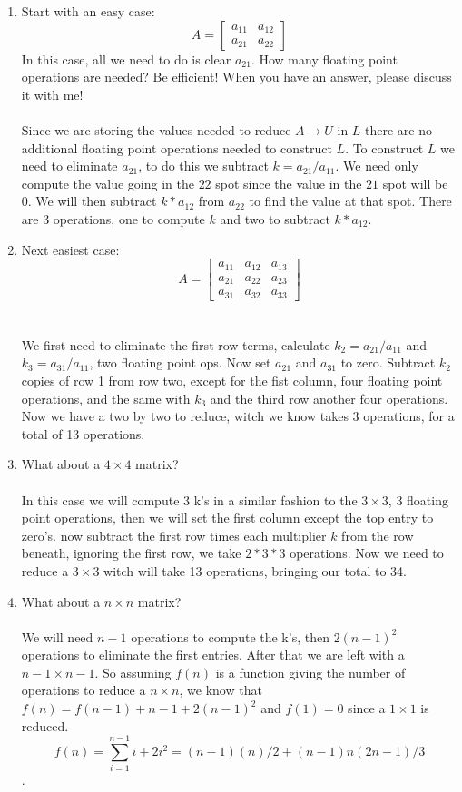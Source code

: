 \documentclass[12pt]{article}
\theoremstyle{homework}
\begin{document}
\begin{enumerate}[(1)]
\item
Start with an easy case:
$$A =
\begin{bmatrix}
a_{11} & a_{12}\\
a_{21} & a_{22}
\end{bmatrix}
$$
In this case, all we need to do is clear $a_{21}$. How many floating point operations are needed?  Be efficient! When you have an answer, please discuss it with me!\\\\
Since we are storing the values needed to reduce $A\rightarrow U$ in $L$ there are no additional floating point operations needed to construct $L$.  To construct $L$ we need to eliminate $a_{21}$, to do this we subtract $k=a_{21}/a_{11}$.  We need only compute the value going in the $22$ spot since the value in the $21$ spot will be 0.  We will then subtract $k*a_{12}$ from $a_{22}$ to find the value at that spot.  There are 3 operations, one to compute $k$ and two to subtract $k*a_{12}$.
\item
Next easiest case:
$$A =\begin{bmatrix}
a_{11}& a_{12}& a_{13}\\
a_{21}& a_{22}& a_{23}\\
a_{31}& a_{32}& a_{33}
\end{bmatrix}$$\\\\
We first need to eliminate the first row terms, calculate $k_2=a_{21}/a_{11}$ and $k_3=a_{31}/a_{11}$, two floating point ops.  Now set $a_{21}$ and $a_{31}$ to zero.  Subtract $k_2$ copies of row 1 from row two, except for the fist column, four floating point operations, and the same with $k_3$ and the third row another four operations.  Now we have a two by two to reduce, witch we know takes 3 operations, for a total of 13 operations.
\item
What about a $4\times 4$ matrix?\\\\
In this case we will compute 3 k's in a similar fashion to the $3\times 3$, 3 floating point operations, then we will set the first column except the top entry to zero's.  now subtract the first row times each multiplier $k$ from the row beneath, ignoring the first row, we take $2*3*3$ operations.  Now we need to reduce a $3\times 3$ witch will take 13 operations, bringing our total to 34.
\item
What about a $n\times n$ matrix?\\\\
We will need $n-1$ operations to compute the k's, then $2(n-1)^2$ operations to eliminate the first entries.  After that we are left with a $n-1\times n-1$.  So assuming $f(n)$ is a function giving the number of operations to reduce a $n\times n$, we know that $f(n)=f(n-1)+n-1+2(n-1)^2$ and $f(1)=0$ since a $1\times 1$ is reduced.
$$f(n)=\sum_{i=1}^{n-1} i+2i^2=(n-1)(n)/2+(n-1)n(2n-1)/3$$.
\end{enumerate}
\end{document}
